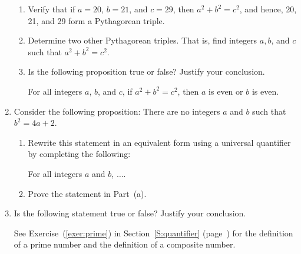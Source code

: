 \begin{enumerate}
\begin{enumerate}
\item Verify that if $a = 20$, $b = 21$, and $c = 29$, then $a^2 + b^2 = c^2$, and hence, 20, 21, and 29 form a Pythagorean triple.

\item Determine two other Pythagorean triples.  That is, find integers $a, b$, and $c$ such that $a^2 + b^2 = c^2$.

\item Is the following proposition true or false?  Justify your conclusion.

For all integers $a$, $b$, and $c$, if $a^2 + b^2 = c^2$, then $a$ is even or $b$ is even.
\end{enumerate}

\item Consider the following proposition:  There are no integers $a$ and $b$ such that 
$b^2 = 4a + 2$.
\begin{enumerate}
\item Rewrite this statement in an equivalent form using a universal quantifier by completing the following:  
\begin{center}
For all integers $a$ and $b$, $\ldots .$
\end{center}
\item Prove the statement in Part~(a).
\end{enumerate}





\item Is the following statement true or false?  Justify your conclusion.


See Exercise~(\ref{exer:prime}) in Section~\ref{S:quantifier} (page~\pageref{exer:prime}) for the definition of a prime number and the definition of a composite number.



\end{enumerate}
